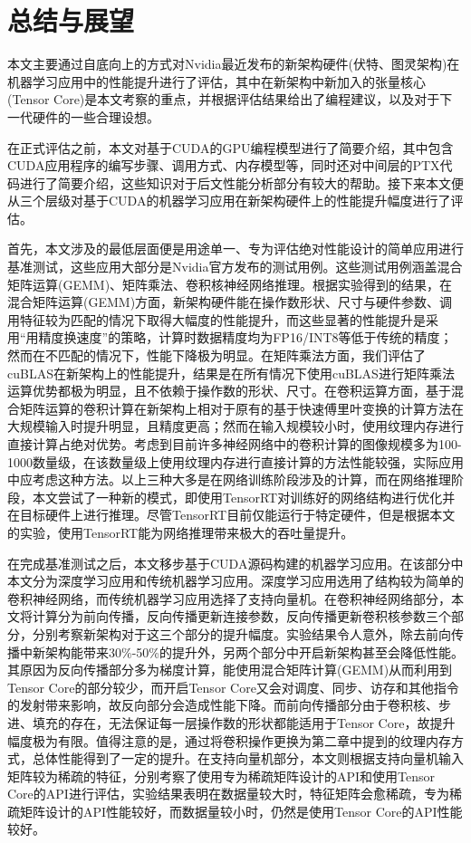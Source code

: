 \newpage
\section{总结与展望}
\setcounter{table}{0}
\setcounter{figure}{0}
\par 本文主要通过自底向上的方式对Nvidia最近发布的新架构硬件(伏特、图灵架构)在机器学习应用中的性能提升进行了评估，其中在新架构中新加入的张量核心(Tensor Core)是本文考察的重点，并根据评估结果给出了编程建议，以及对于下一代硬件的一些合理设想。
\par 在正式评估之前，本文对基于CUDA的GPU编程模型进行了简要介绍，其中包含CUDA应用程序的编写步骤、调用方式、内存模型等，同时还对中间层的PTX代码进行了简要介绍，这些知识对于后文性能分析部分有较大的帮助。接下来本文便从三个层级对基于CUDA的机器学习应用在新架构硬件上的性能提升幅度进行了评估。
\par 首先，本文涉及的最低层面便是用途单一、专为评估绝对性能设计的简单应用进行基准测试，这些应用大部分是Nvidia官方发布的测试用例。这些测试用例涵盖混合矩阵运算(GEMM)、矩阵乘法、卷积核神经网络推理。根据实验得到的结果，在混合矩阵运算(GEMM)方面，新架构硬件能在操作数形状、尺寸与硬件参数、调用特征较为匹配的情况下取得大幅度的性能提升，而这些显著的性能提升是采用“用精度换速度”的策略，计算时数据精度均为FP16/INT8等低于传统的精度；然而在不匹配的情况下，性能下降极为明显。在矩阵乘法方面，我们评估了cuBLAS在新架构上的性能提升，结果是在所有情况下使用cuBLAS进行矩阵乘法运算优势都极为明显，且不依赖于操作数的形状、尺寸。在卷积运算方面，基于混合矩阵运算的卷积计算在新架构上相对于原有的基于快速傅里叶变换的计算方法在大规模输入时提升明显，且精度更高；然而在输入规模较小时，使用纹理内存进行直接计算占绝对优势。考虑到目前许多神经网络中的卷积计算的图像规模多为100-1000数量级，在该数量级上使用纹理内存进行直接计算的方法性能较强，实际应用中应考虑这种方法。以上三种大多是在网络训练阶段涉及的计算，而在网络推理阶段，本文尝试了一种新的模式，即使用TensorRT对训练好的网络结构进行优化并在目标硬件上进行推理。尽管TensorRT目前仅能运行于特定硬件，但是根据本文的实验，使用TensorRT能为网络推理带来极大的吞吐量提升。
\par 在完成基准测试之后，本文移步基于CUDA源码构建的机器学习应用。在该部分中本文分为深度学习应用和传统机器学习应用。深度学习应用选用了结构较为简单的卷积神经网络，而传统机器学习应用选择了支持向量机。在卷积神经网络部分，本文将计算分为前向传播，反向传播更新连接参数，反向传播更新卷积核参数三个部分，分别考察新架构对于这三个部分的提升幅度。实验结果令人意外，除去前向传播中新架构能带来30\%-50\%的提升外，另两个部分中开启新架构甚至会降低性能。其原因为反向传播部分多为梯度计算，能使用混合矩阵计算(GEMM)从而利用到Tensor Core的部分较少，而开启Tensor Core又会对调度、同步、访存和其他指令的发射带来影响，故反向部分会造成性能下降。而前向传播部分由于卷积核、步进、填充的存在，无法保证每一层操作数的形状都能适用于Tensor Core，故提升幅度极为有限。值得注意的是，通过将卷积操作更换为第二章中提到的纹理内存方式，总体性能得到了一定的提升。在支持向量机部分，本文则根据支持向量机输入矩阵较为稀疏的特征，分别考察了使用专为稀疏矩阵设计的API和使用Tensor Core的API进行评估，实验结果表明在数据量较大时，特征矩阵会愈稀疏，专为稀疏矩阵设计的API性能较好，而数据量较小时，仍然是使用Tensor Core的API性能较好。
